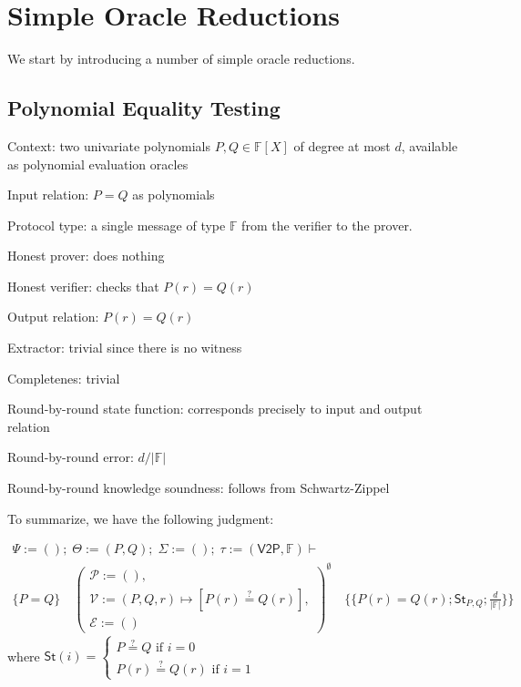 \section{Simple Oracle Reductions}

We start by introducing a number of simple oracle reductions.

\subsection{Polynomial Equality Testing}

Context: two univariate polynomials $P, Q \in \mathbb{F}[X]$ of degree at most $d$, available as polynomial evaluation oracles

Input relation: $P = Q$ as polynomials

Protocol type: a single message of type $\mathbb{F}$ from the verifier to the prover.

Honest prover: does nothing

Honest verifier: checks that $P(r) = Q(r)$

Output relation: $P(r) = Q(r)$

Extractor: trivial since there is no witness

Completenes: trivial

Round-by-round state function: corresponds precisely to input and output relation

\newcommand{\abs}[1]{\lvert #1 \rvert}

Round-by-round error: $d / \abs{\mathbb{F}}$

Round-by-round knowledge soundness: follows from Schwartz-Zippel

To summarize, we have the following judgment:

\[
    \begin{array}{c}
        \Psi := (); \; \Theta := (P, Q); \; \Sigma := (); \; \tau := (\mathsf{V2P}, \mathbb{F}) \vdash \\[1ex]
        \{P = Q\} \quad \left(
        \begin{array}{l}
            \mathcal{P} := (), \\
            \mathcal{V} := (P,Q,r) \mapsto [P(r) \stackrel{?}{=} Q(r)], \\
            \mathcal{E} := ()
        \end{array}
        \right)^{\emptyset} \quad \{\!\{P(r) = Q(r); \mathsf{St}_{P,Q}; \frac{d}{\abs{\mathbb{F}}}\}\!\}
    \end{array}
\]
where $\mathsf{St}(i) = \begin{cases} P \stackrel{?}{=} Q \text{ if } i = 0 \\ P(r) \stackrel{?}{=} Q(r) \text{ if } i = 1 \end{cases}$

